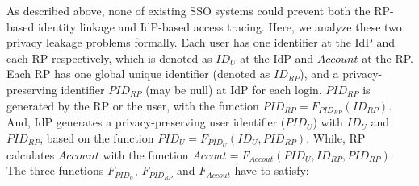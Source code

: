 As described above, none of existing SSO systems could prevent both the RP-based identity linkage and IdP-based access tracing.
Here, we analyze these two privacy leakage problems formally.
Each user has one identifier at the IdP and each RP respectively, which is denoted as $ID_U$ at the IdP and $Account$ at the RP.
Each RP has one global unique identifier (denoted as $ID_{RP}$), and a privacy-preserving identifier $PID_{RP}$ (may be null) at IdP for each login.
$PID_{RP}$ is generated by the RP or the user, with the function $PID_{RP}=F_{PID_{RP}}(ID_{RP})$.
And, IdP generates a  privacy-preserving user identifier ($PID_U$) with $ID_U$ and $PID_{RP}$, based on the function  $PID_{U}=F_{PID_{U}}(ID_U, PID_{RP})$.
While,  RP calculates $Account$ with the function  $Accout=F_{Accout}(PID_U, ID_{RP}, PID_{RP})$.
The three functions $F_{PID_{U}}$, $F_{PID_{RP}}$ and $F_{Accout}$  have to satisfy:
